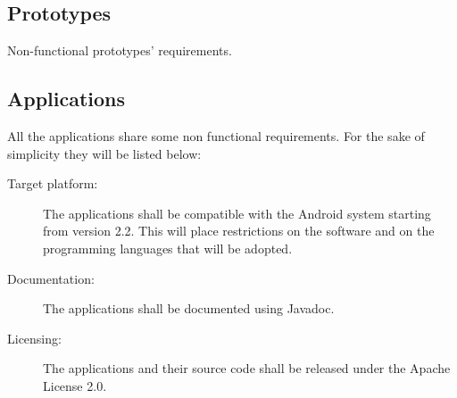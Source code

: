 \subsection{Prototypes}

Non-functional prototypes' requirements.

\subsection{Applications}

All the applications share some non functional requirements.
For the sake of simplicity they will be listed below:

\begin{description}
	\item[Target platform:] The applications shall be compatible with the
	Android system starting from version 2.2. This will place restrictions on
	the software and on the programming languages that will be adopted.
	\item[Documentation:] The applications shall be documented using Javadoc.
	\item[Licensing:] The applications and their source code shall be released under the Apache
	License 2.0.
\end{description}
